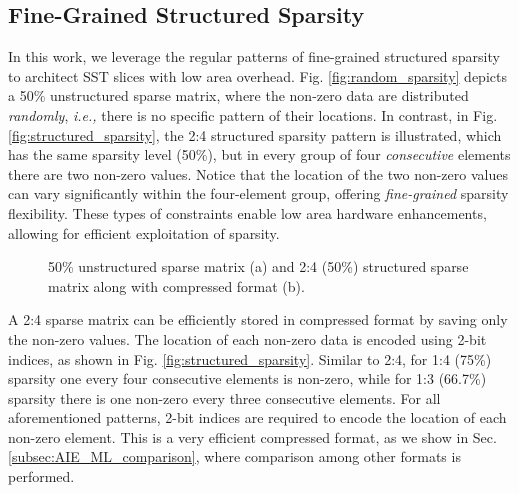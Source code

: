 




\subsection{Fine-Grained Structured Sparsity}
\label{subsec:Fine_grained_structured_sparsity}
In this work, we leverage the regular patterns of fine-grained structured sparsity to architect SST slices with low area overhead. 
Fig. \ref{fig:random_sparsity} depicts a 50\% unstructured sparse matrix, where the non-zero data are distributed \textit{randomly}, \emph{i.e.,} there is no specific pattern of their locations.
In contrast, in Fig. \ref{fig:structured_sparsity}, the 2:4 structured sparsity pattern is illustrated, which has the same sparsity level (50\%), but in every group of four \textit{consecutive} elements
there are two non-zero values. 
Notice that the location of the two non-zero values can vary significantly within the four-element group, offering \textit{fine-grained} sparsity flexibility.  
These types of constraints enable low area hardware enhancements, allowing for efficient  exploitation of sparsity.


\begin{figure}[t]
\vspace{-0.70cm}
\centering
{}

\vspace{-0.35cm}

\caption{50\% unstructured sparse matrix (a) and 2:4 (50\%) structured sparse matrix along with compressed format (b).} 
\label{fig:sparsity_struct_unstruct}
\vspace{-0.50cm}
\end{figure}


A 2:4 sparse matrix can be efficiently stored in  compressed format by saving only the non-zero values.
The location of each non-zero data is encoded using 2-bit indices, as shown in Fig. \ref{fig:structured_sparsity}.
Similar to 2:4, for 1:4 (75\%) sparsity one every four consecutive elements is non-zero, while for 1:3 (66.7\%) sparsity there is one non-zero every three consecutive elements.  
For all aforementioned patterns, 2-bit indices are required to encode the location of each non-zero element.
This is a very efficient compressed format, as we show in Sec. \ref{subsec:AIE_ML_comparison}, where comparison among other formats is performed.











